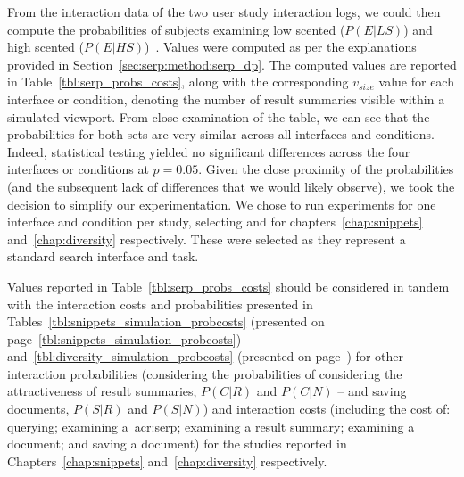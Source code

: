 \begin{table}[t!]
\begin{center}
\begin{tabulary}{\textwidth}{L{3.75cm}@{\CS}D{2.6cm}@{\CS}D{2.6cm}@{\CS}D{2.6cm}@{\CS}D{2.6cm}@{\CS}}
    \end{tabulary}
    \end{center}
\end{table}

From the interaction data of the two user study interaction logs, we could then compute the probabilities of subjects examining low scented ($P(E|LS)$) and high scented ($P(E|HS)$)~. Values were computed as per the explanations provided in Section~\ref{sec:serp:method:serp_dp}. The computed values are reported in Table~\ref{tbl:serp_probs_costs}, along with the corresponding $v_{size}$ value for each interface or condition, denoting the number of result summaries visible within a simulated viewport. From close examination of the table, we can see that the probabilities for both sets are very similar across all interfaces and conditions. Indeed, statistical testing yielded no significant differences across the four interfaces or conditions at $p=0.05$. Given the close proximity of the probabilities (and the subsequent lack of differences that we would likely observe), we took the decision to simplify our experimentation. We chose to run experiments for one interface and condition per study, selecting  and  for chapters~\ref{chap:snippets} and~\ref{chap:diversity} respectively. These were selected as they represent a standard search interface and task.

Values reported in Table~\ref{tbl:serp_probs_costs} should be considered in tandem with the interaction costs and probabilities presented in Tables~\ref{tbl:snippets_simulation_probcosts} (presented on page~\ref{tbl:snippets_simulation_probcosts}) and~\ref{tbl:diversity_simulation_probcosts} (presented on page~\pageref{tbl:diversity_simulation_probcosts}) for other interaction probabilities (considering the probabilities of considering the attractiveness of result summaries, $P(C|R)$ and $P(C|N)$ -- and saving documents, $P(S|R)$ and $P(S|N)$) and interaction costs (including the cost of: querying; examining a~\gls{acr:serp}; examining a result summary; examining a document; and saving a document) for the studies reported in Chapters~\ref{chap:snippets} and~\ref{chap:diversity} respectively.

